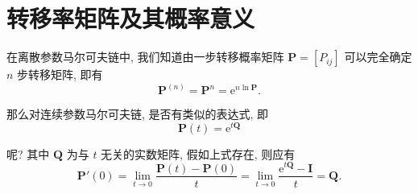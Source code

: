 \documentclass[openany]{ctexbook}
\theoremstyle{kaiti}
\theoremstyle{normal}
\begin{document}
\section{转移率矩阵及其概率意义}

在离散参数马尔可夫链中, 我们知道由一步转移概率矩阵 $\bm{P}=[P_{ij}]$ 可以完全确定 $n$ 步转移矩阵, 即有
\begin{equation}
  \bm{P}^{(n)}=\bm{P}^n=\mathrm{e}^{n\ln\bm{P}}.
\end{equation}

那么对连续参数马尔可夫链, 是否有类似的表达式, 即
\begin{equation}
  \bm{P}(t)=\mathrm{e}^{t\bm{Q}}
\end{equation}

呢? 其中 $\bm{Q}$ 为与 $t$ 无关的实数矩阵, 假如上式存在, 则应有
\begin{equation}
  \bm{P}'(0)=\lim_{t\to0}\frac{\bm{P}(t)-\bm{P}(0)}{t}=\lim_{t\to0}\frac{\mathrm{e}^{t\bm{Q}}-\bm{I}}{t}=\bm{Q}.
\end{equation}
\end{document}
